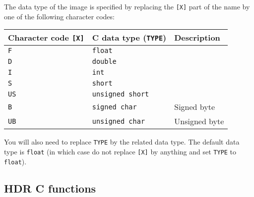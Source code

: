 \documentclass[twoside,11pt,nolof]{starlink}
\begin{document}
\label{IMGCdatatypes}
The data type of the image is specified by replacing the \texttt{[X]} part
of the name by one of the following character codes:
\begin{small}
\begin{center}
\begin{tabular}{||l|l|l||}
\hline
Character code \texttt{[X]} & C data type (\texttt{TYPE}) &  Description \\
\hline
 \texttt{F}       & \texttt{float}          &   \\
 \texttt{D}       & \texttt{double}         &  \\
 \texttt{I}       & \texttt{int}            &  \\
 \texttt{S}       & \texttt{short}          &  \\
 \texttt{US}      & \texttt{unsigned short} &  \\
 \texttt{B}       & \texttt{signed char}    &  Signed byte      \\
 \texttt{UB}      & \texttt{unsigned char}  &  Unsigned byte    \\
\hline
\end{tabular}
\end{center}
\end{small}
You will also need to replace \texttt{TYPE} by the related data type.
The default data type is \texttt{float} (in which case do not replace
\texttt{[X]} by anything and set \texttt{TYPE} to \texttt{float}).

\subsection{HDR C functions}
\end{document}
